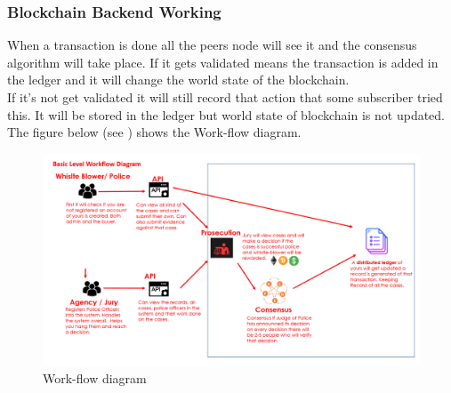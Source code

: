 \subsubsection{Blockchain Backend Working}
When a transaction is done all the peers node will see it and the consensus algorithm will take place. If it gets validated means the transaction is added in the ledger and it will change the world state of the blockchain.\\ 
If it’s not get validated it will still record that action that some subscriber tried this. It will be stored in the ledger but world state of blockchain is not updated.
The figure below (see ) shows the Work-flow diagram.\\ 
\begin{figure}[h]
	\centering
	\includegraphics[scale=0.40]{figures/09.png}
	\caption{Work-flow diagram }
	\label{fig:istf}
\end{figure} 
